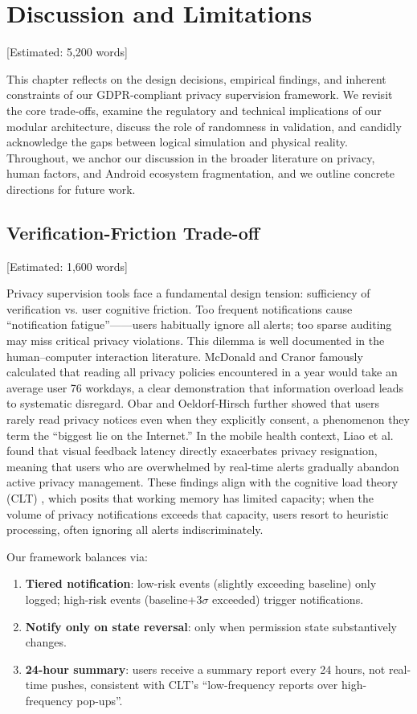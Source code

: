 \newpage\section{Discussion and Limitations} [Estimated: 5,200 words]

This chapter reflects on the design decisions, empirical findings, and inherent constraints of our GDPR‑compliant privacy supervision framework. We revisit the core trade‑offs, examine the regulatory and technical implications of our modular architecture, discuss the role of randomness in validation, and candidly acknowledge the gaps between logical simulation and physical reality. Throughout, we anchor our discussion in the broader literature on privacy, human factors, and Android ecosystem fragmentation, and we outline concrete directions for future work.

\subsection{Verification-Friction Trade-off} [Estimated: 1,600 words]

Privacy supervision tools face a fundamental design tension: sufficiency of verification vs. user cognitive friction. Too frequent notifications cause ``notification fatigue''——users habitually ignore all alerts; too sparse auditing may miss critical privacy violations. This dilemma is well documented in the human–computer interaction literature. McDonald and Cranor \cite{12} famously calculated that reading all privacy policies encountered in a year would take an average user 76 workdays, a clear demonstration that information overload leads to systematic disregard. Obar and Oeldorf‐Hirsch \cite{13} further showed that users rarely read privacy notices even when they explicitly consent, a phenomenon they term the ``biggest lie on the Internet.'' In the mobile health context, Liao et al. \cite{14} found that visual feedback latency directly exacerbates privacy resignation, meaning that users who are overwhelmed by real‑time alerts gradually abandon active privacy management. These findings align with the cognitive load theory (CLT) \cite{27}, which posits that working memory has limited capacity; when the volume of privacy notifications exceeds that capacity, users resort to heuristic processing, often ignoring all alerts indiscriminately.

Our framework balances via:
\begin{enumerate}
\item \textbf{Tiered notification}: low-risk events (slightly exceeding baseline) only logged; high-risk events (baseline+3$\sigma$ exceeded) trigger notifications.
\item \textbf{Notify only on state reversal}: only when permission state substantively changes.
\item \textbf{24-hour summary}: users receive a summary report every 24 hours, not real-time pushes, consistent with CLT's ``low-frequency reports over high-frequency pop-ups''.
\end{enumerate}

